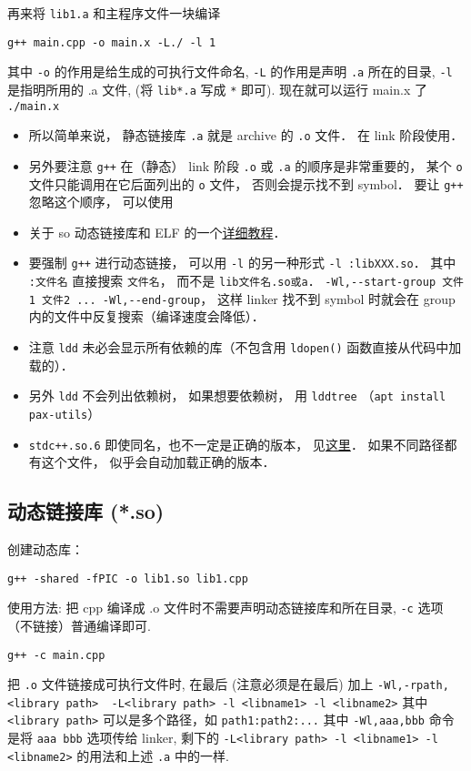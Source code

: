 再来将 \verb|lib1.a| 和主程序文件一块编译
\begin{lstlisting}[language=none]
g++ main.cpp -o main.x -L./ -l 1
\end{lstlisting}

其中 \verb`-o` 的作用是给生成的可执行文件命名, \verb`-L` 的作用是声明 \verb`.a` 所在的目录, \verb`-l` 是指明所用的 .a 文件, (将 \verb`lib*.a` 写成 \verb`*` 即可).
现在就可以运行 main.x 了
\verb`./main.x`

\begin{itemize}
\item 所以简单来说， 静态链接库 \verb`.a` 就是 archive 的 \verb`.o` 文件． 在 link 阶段使用．
\item 另外要注意 \verb`g++` 在（静态） link 阶段 \verb`.o` 或 \verb`.a` 的顺序是非常重要的， 某个 \verb`o` 文件只能调用在它后面列出的 \verb`o` 文件， 否则会提示找不到 symbol． 要让 \verb`g++` 忽略这个顺序， 可以使用
\item 关于 so 动态链接库和 ELF 的一个\href{https://amir.rachum.com/blog/2016/09/17/shared-libraries/}{详细教程}．
\item 要强制 \verb|g++| 进行动态链接， 可以用 \verb|-l| 的另一种形式 \verb|-l :libXXX.so|． 其中 \verb|:文件名| 直接搜索 \verb|文件名|， 而不是 \verb|lib文件名.so或a|．
\verb`-Wl,--start-group 文件1 文件2 ... -Wl,--end-group`， 这样 linker 找不到 symbol 时就会在 group 内的文件中反复搜索（编译速度会降低）．
\item 注意 \verb|ldd| 未必会显示所有依赖的库（不包含用 \verb|ldopen()| 函数直接从代码中加载的）．
\item 另外 \verb|ldd| 不会列出依赖树， 如果想要依赖树， 用 \verb|lddtree| （\verb|apt install pax-utils|）
\item \verb|stdc++.so.6| 即使同名，也不一定是正确的版本， 见\href{https://unix.stackexchange.com/questions/458659/what-do-the-multiple-glibc-versions-mean-in-the-output-of-ldd}{这里}． 如果不同路径都有这个文件， 似乎会自动加载正确的版本．
\end{itemize}

\subsection{动态链接库 (*.so)}
创建动态库：
\begin{lstlisting}[language=none]
g++ -shared -fPIC -o lib1.so lib1.cpp
\end{lstlisting}

使用方法:
把 cpp 编译成 .o 文件时不需要声明动态链接库和所在目录, \verb`-c` 选项（不链接）普通编译即可.
\begin{lstlisting}[language=none]
g++ -c main.cpp
\end{lstlisting}
把 \verb|.o| 文件链接成可执行文件时, 在最后 (注意必须是在最后) 加上
\verb`-Wl,-rpath,<library path>  -L<library path> -l <libname1> -l <libname2>` 其中 \verb|<library path>| 可以是多个路径，如 \verb|path1:path2:...|
其中 \verb`-Wl,aaa,bbb` 命令是将 \verb`aaa bbb` 选项传给 linker, 剩下的 \verb`-L<library path> -l <libname1> -l <libname2>` 的用法和上述 \verb|.a| 中的一样.

